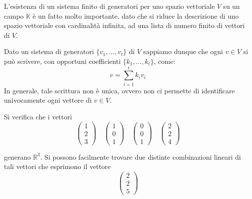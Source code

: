 L'esistenza di un sistema finito di generatori per uno spazio vettoriale
$V$ su un campo $\mathbb{K}$ \`e un fatto molto importante, dato che
si riduce la descrizione di uno spazio vettoriale con cardinalit\`a
infinita, ad una lista di numero finito di vettori di $V$.


Dato un sistema di generatori $\{v_1, ..., v_t\}$ di $V$ sappiamo dunque
che ogni $v \in V$ si pu\`o scrivere, con opportuni coefficienti
$\{k_1, ..., k_t\}$, come:
\begin{equation*}
	v = \sum_{i=1}^t k_i v_i
\end{equation*}
In generale, tale scrittura non \`e unica, ovvero non ci permette di
identificare univocamente ogni vettore di $v \in V$.

\begin{example}
	Si verifica che i vettori
	\begin{equation*}
		\begin{pmatrix}
			1 \\ 2 \\ 3
		\end{pmatrix} \quad
		\begin{pmatrix}
			1 \\ 0 \\ 1
		\end{pmatrix} \quad
		\begin{pmatrix}
			0 \\ 0 \\ 1
		\end{pmatrix} \quad
		\begin{pmatrix}
			2 \\ 2 \\ 4
		\end{pmatrix}
	\end{equation*}

	generano $\mathbb{R}^3$. Si possono facilmente trovare due distinte
	combinazioni lineari di tali vettori che esprimono il vettore
	\begin{equation*}
		\begin{pmatrix}
			2 \\ 2 \\ 5
		\end{pmatrix}
	\end{equation*}


\end{example}
